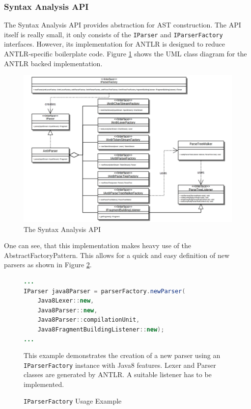 \subsubsection{Syntax Analysis API}
\label{subsubsection:SyntaxAnalysisAPI}
The Syntax Analysis \gls{API} provides abstraction for \gls{AST} construction.
The \gls{API} itself is really small, it only consists of the \texttt{IParser} and \texttt{IParserFactory} interfaces.
However, its implementation for \gls{ANTLR} is designed to reduce \gls{ANTLR}-specific boilerplate code.
Figure \ref{figure:SyntaxAnalysisAPI} shows the \gls{UML} class diagram for the \gls{ANTLR} backed implementation.
\begin{figure}[h!]
\begin{center}
\includegraphics[width=\textwidth]{images/SyntaxAnalysisAPI.png}
\end{center}
\caption{The Syntax Analysis API}
\label{figure:SyntaxAnalysisAPI}
\end{figure}
One can see, that this implementation makes heavy use of the \gls{AbstractFactoryPattern}.
This allows for a quick and easy definition of new parsers as shown in Figure \ref{figure:IParserFactoryUsageExample}.

\begin{figure}[h!]
\begin{lstlisting}[language=Java]
...
IParser java8Parser = parserFactory.newParser(
	Java8Lexer::new,
	Java8Parser::new, 
	Java8Parser::compilationUnit, 
	Java8FragmentBuildingListener::new);
...
\end{lstlisting}
{
\scriptsize
This example demonstrates the creation of a new parser using an \texttt{IParserFactory} instance with \gls{Java}8 features.
Lexer and Parser classes are generated by \gls{ANTLR}.
A suitable listener has to be implemented.
}
\caption{\texttt{IParserFactory} Usage Example}
\label{figure:IParserFactoryUsageExample}
\end{figure}

